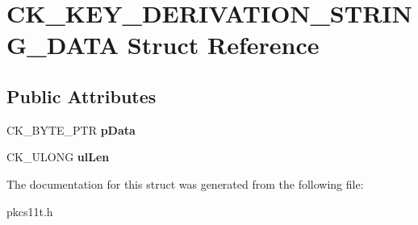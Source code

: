 \hypertarget{struct_c_k___k_e_y___d_e_r_i_v_a_t_i_o_n___s_t_r_i_n_g___d_a_t_a}{}\section{C\+K\+\_\+\+K\+E\+Y\+\_\+\+D\+E\+R\+I\+V\+A\+T\+I\+O\+N\+\_\+\+S\+T\+R\+I\+N\+G\+\_\+\+D\+A\+TA Struct Reference}
\label{struct_c_k___k_e_y___d_e_r_i_v_a_t_i_o_n___s_t_r_i_n_g___d_a_t_a}
\subsection*{Public Attributes}
\begin{DoxyCompactItemize}
\item 
\mbox{\label{struct_c_k___k_e_y___d_e_r_i_v_a_t_i_o_n___s_t_r_i_n_g___d_a_t_a_aec743fb0867bb539ae70ab008e17c27b}} 
C\+K\+\_\+\+B\+Y\+T\+E\+\_\+\+P\+TR {\bfseries p\+Data}
\item 
\mbox{\label{struct_c_k___k_e_y___d_e_r_i_v_a_t_i_o_n___s_t_r_i_n_g___d_a_t_a_a11068ec8d8e05a164dd2bb2bbeddf924}} 
C\+K\+\_\+\+U\+L\+O\+NG {\bfseries ul\+Len}
\end{DoxyCompactItemize}


The documentation for this struct was generated from the following file\+:\begin{DoxyCompactItemize}
\item 
pkcs11t.\+h\end{DoxyCompactItemize}
